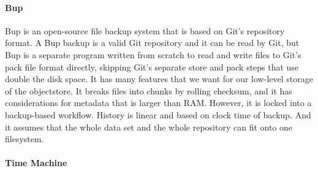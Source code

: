 \paragraph{Bup}\label{related_bup}

Bup \cite{bup_homepage} is an open-source file backup system that is based on
Git's repository format. A Bup backup is a valid Git repository and it can be
read by Git, but Bup is a separate program written from scratch to read and
write files to Git's pack file format directly, skipping Git's separate store
and pack steps that use double the disk space. It has many features that we want
for our low-level storage of the \gls{objectstore}. It breaks files into chunks
by rolling checksum, and it has considerations for metadata that is larger than
RAM. However, it is locked into a backup-based workflow. History is linear and
based on clock time of backup. And it assumes that the whole data set and the
whole repository can fit onto one filesystem.


\paragraph{Time Machine}

